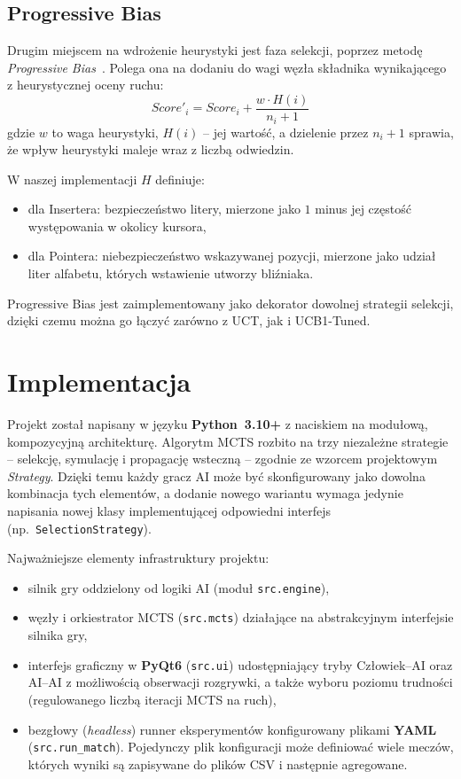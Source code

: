 \documentclass{article}
\begin{document}
\subsection{Progressive Bias}
Drugim miejscem na wdrożenie heurystyki jest faza selekcji, poprzez metodę
\emph{Progressive Bias}~\cite{Chaslot2008}. Polega ona na dodaniu do wagi
węzła składnika wynikającego z heurystycznej oceny ruchu:
\begin{equation}
    Score'_i = Score_i + \frac{w \cdot H(i)}{n_i + 1}
\end{equation}
gdzie $w$ to waga heurystyki, $H(i)$ -- jej wartość, a dzielenie przez
$n_i + 1$ sprawia, że wpływ heurystyki maleje wraz z liczbą odwiedzin.

W naszej implementacji $H$ definiuje:
\begin{itemize}
    \item dla Insertera: bezpieczeństwo litery, mierzone jako $1$ minus
    jej częstość występowania w okolicy kursora,
    \item dla Pointera: niebezpieczeństwo wskazywanej pozycji, mierzone
    jako udział liter alfabetu, których wstawienie utworzy bliźniaka.
\end{itemize}
Progressive Bias jest zaimplementowany jako dekorator dowolnej strategii
selekcji, dzięki czemu można go łączyć zarówno z UCT, jak i UCB1-Tuned.

\section{Implementacja}

Projekt został napisany w języku \textbf{Python~3.10+} z naciskiem na
modułową, kompozycyjną architekturę. Algorytm MCTS rozbito na trzy
niezależne strategie -- selekcję, symulację i propagację wsteczną --
zgodnie ze wzorcem projektowym \emph{Strategy}. Dzięki temu każdy gracz AI
może być skonfigurowany jako dowolna kombinacja tych elementów, a dodanie
nowego wariantu wymaga jedynie napisania nowej klasy implementującej
odpowiedni interfejs (np.\ \texttt{SelectionStrategy}).

Najważniejsze elementy infrastruktury projektu:
\begin{itemize}
    \item silnik gry oddzielony od logiki AI (moduł \texttt{src.engine}),
    \item węzły i orkiestrator MCTS (\texttt{src.mcts}) działające na
    abstrakcyjnym interfejsie silnika gry,
    \item interfejs graficzny w \textbf{PyQt6} (\texttt{src.ui})
    udostępniający tryby Człowiek--AI oraz AI--AI z możliwością obserwacji
    rozgrywki, a także wyboru poziomu trudności (regulowanego liczbą
    iteracji MCTS na ruch),
    \item bezgłowy (\textit{headless}) runner eksperymentów konfigurowany
    plikami \textbf{YAML} (\texttt{src.run\_match}). Pojedynczy plik
    konfiguracji może definiować wiele meczów, których wyniki są zapisywane
    do plików CSV i następnie agregowane.
\end{itemize}
\end{document}
